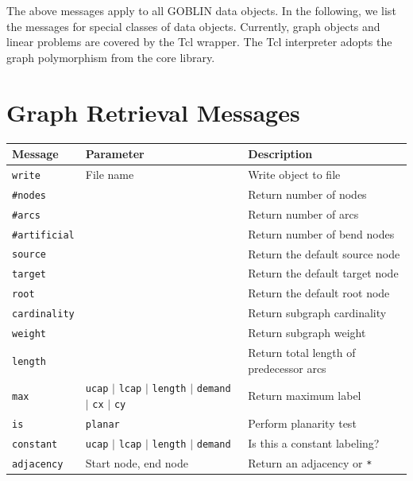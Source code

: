 \documentclass[a4paper,11pt,twoside]{book}
\begin{document}
\bigskip
\noindent
The above messages apply to all GOBLIN data objects.
In the following, we list the messages for special classes of data objects.
Currently, graph objects and linear problems are covered by the Tcl wrapper.
The Tcl interpreter adopts the graph polymorphism from the core library.



\section{Graph Retrieval Messages}
\begin{center}
\begin{tabular}{|p{3cm}|p{9cm}|p{12.5cm}|}
\hline
{\bf Message}       & {\bf Parameter} & {\bf Description} \\
\hline
\hline
\verb/write/        & File name & Write object to file \\
\hline
\verb/#nodes/       &  &  Return number of nodes \\
\hline
\verb/#arcs/        &  &  Return number of arcs \\
\hline
\verb/#artificial/  &  &  Return number of bend nodes \\
\hline
\verb/source/       &  &  Return the default source node \\
\hline
\verb/target/       &  &  Return the default target node \\
\hline
\verb/root/         &  &  Return the default root node \\
\hline
\verb/cardinality/  &  &  Return subgraph cardinality \\
\hline
\verb/weight/       &  &  Return subgraph weight \\
\hline
\verb/length/       &  &  Return total length of predecessor arcs \\
\hline
\verb/max/          & \verb/ucap/ $|$ \verb/lcap/ $|$ \verb/length/ $|$
                      \verb/demand/ $|$ \verb/cx/ $|$ \verb/cy/
                    & Return maximum label \\
\hline
\verb/is/           & \verb/planar/ 
                    & Perform planarity test \\
\hline
\verb/constant/     & \verb/ucap/ $|$ \verb/lcap/ $|$ \verb/length/ $|$ \verb/demand/
                    & Is this a constant labeling? \\
\hline
\verb/adjacency/    & Start node, end node & Return an adjacency or \verb/*/ \\
\hline
\end{tabular}
\end{center}
\end{document}
